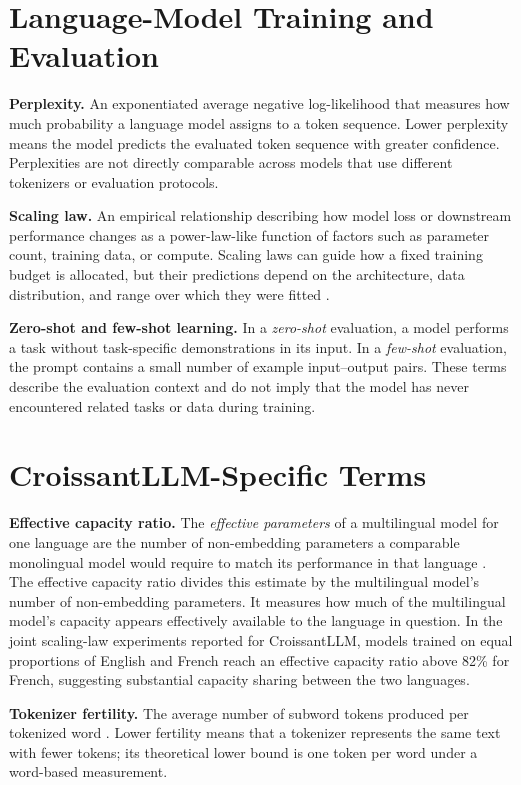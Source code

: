 \section*{Language-Model Training and Evaluation}

\noindent\textbf{Perplexity.}
An exponentiated average negative log-likelihood that measures how much
probability a language model assigns to a token sequence. Lower perplexity means
the model predicts the evaluated token sequence with greater confidence.
Perplexities are not directly comparable across models that use different
tokenizers or evaluation protocols.

\noindent\textbf{Scaling law.}
An empirical relationship describing how model loss or downstream performance
changes as a power-law-like function of factors such as parameter count,
training data, or compute. Scaling laws can guide how a fixed training budget is
allocated, but their predictions depend on the architecture, data distribution,
and range over which they were fitted
.

\noindent\textbf{Zero-shot and few-shot learning.}
In a \emph{zero-shot} evaluation, a model performs a task without task-specific
demonstrations in its input. In a \emph{few-shot} evaluation, the prompt
contains a small number of example input--output pairs. These terms describe
the evaluation context and do not imply that the model has never encountered
related tasks or data during training.

\section*{CroissantLLM-Specific Terms}

\noindent\textbf{Effective capacity ratio.}
The \emph{effective parameters} of a multilingual model for one language are the
number of non-embedding parameters a comparable monolingual model would require
to match its performance in that language .
The effective capacity ratio divides this estimate by the multilingual model's
number of non-embedding parameters. It measures how much of the multilingual
model's capacity appears effectively available to the language in question. In
the joint scaling-law experiments reported for CroissantLLM, models trained on
equal proportions of English and French reach an effective capacity ratio above
82\% for French, suggesting substantial capacity sharing between the two
languages.

\noindent\textbf{Tokenizer fertility.}
The average number of subword tokens produced per tokenized word
. Lower fertility means that a tokenizer represents the
same text with fewer tokens; its theoretical lower bound is one token per word
under a word-based measurement.
